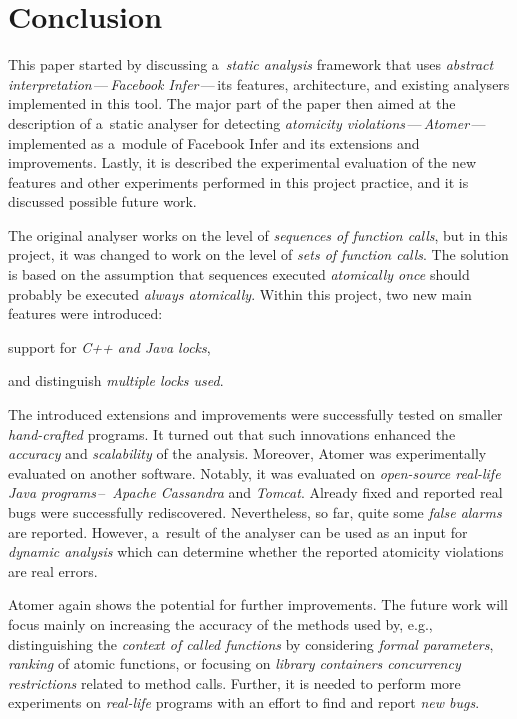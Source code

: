 \section{Conclusion}
\label{sec:conc}

This paper started by discussing a~\emph{static analysis} framework that uses
\emph{abstract interpretation}\,---\,\emph{Facebook Infer}\,---\,its features,
architecture, and existing analysers implemented in this tool. The major part
of the paper then aimed at the description of a~static analyser for detecting
\emph{atomicity violations}\,---\,\emph{Atomer}\,---\,implemented as a~module
of Facebook Infer and its extensions and improvements. Lastly, it is described
the experimental evaluation of the new features and other experiments performed
in this project practice, and it is discussed possible future work.

The original analyser works on the level of \emph{sequences of function calls},
but in this project, it was changed to work on the level of \emph{sets of
function calls}. The solution is based on the assumption that sequences
executed \emph{atomically once} should probably be executed \emph{always
atomically}. Within this project, two new main features were introduced:
\begin{enumerate*}[label={(\roman*)}]
    \item
        support for \emph{C++ and Java locks},

    \item
        and distinguish \emph{multiple locks used}.
\end{enumerate*}

The introduced extensions and improvements were successfully tested on
smaller \emph{hand-crafted} programs. It turned out that such innovations
enhanced the \emph{accuracy} and \emph{scalability} of the analysis. Moreover,
Atomer was experimentally evaluated on another software. Notably, it was
evaluated on \emph{open-source real-life Java programs}\,--\,\emph{
Apache Cassandra} and \emph{Tomcat}. Already fixed and reported real bugs
were successfully rediscovered. Nevertheless, so far, quite some \emph{false
alarms} are reported. However, a~result of the analyser can be used as an
input for \emph{dynamic analysis} which can determine whether the reported
atomicity violations are real errors.

Atomer again shows the potential for further improvements. The future work
will focus mainly on increasing the accuracy of the methods used by, e.g.,
distinguishing the \emph{context of called functions} by considering
\emph{formal parameters}, \emph{ranking} of atomic functions, or focusing on
\emph{library containers concurrency restrictions} related to method calls.
Further, it is needed to perform more experiments on \emph{real-life}
programs with an effort to find and report \emph{new bugs}.

